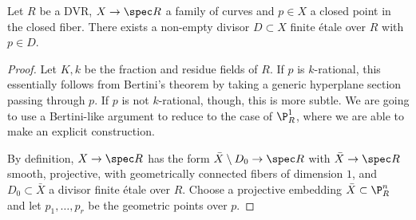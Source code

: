 \begin{lemma}
\notready
    Let $R$ be a DVR, $X\to \spec R$ a family of curves and $p\in X$ a closed point in the closed fiber. There exists a non-empty divisor $D\subset X$ finite étale over $R$ with $p\in D$.
	\begin{proof}






		Let $K,k$ be the fraction and residue fields of $R$. If $p$ is $k$-rational, this essentially follows from Bertini's theorem by taking a generic hyperplane section passing through $p$. If $p$ is not $k$-rational, though, this is more subtle. We are going to use a Bertini-like argument to reduce to the case of $\P^{1}_{R}$, where we are able to make an explicit construction.

		By definition, $X\to\spec R$ has the form $\bar{X}\setminus D_{0}\to\spec R$ with $\bar{X}\to\spec R$ smooth, projective, with geometrically connected fibers of dimension $1$, and $D_{0}\subset\bar{X}$ a divisor finite étale over $R$. Choose a projective embedding $\bar{X}\subset\P^{n}_{R}$ and let $p_{1},\dots,p_{r}$ be the geometric points over $p$.


\end{proof}
\end{lemma}
